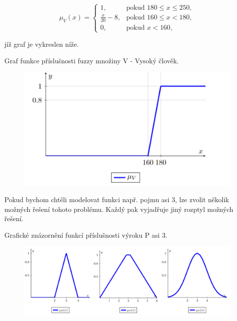     $$\mu_V(x)=\begin{cases} 1, & \mbox{pokud }  180\leq x \leq 250,\\ 
    \frac{x}{20} - 8, & \mbox{pokud } 160 \leq x < 180,\\
    0, & \mbox{pokud } x < 160,  \end{cases}$$

    jíž graf je vykreslen níže.

    \begin{graph} Graf funkce příslušnosti fuzzy množiny V - \clqq Vysoký člověk\crqq.\\
    \begin{figure}[h]
        \includegraphics[scale=0.65]{template-fig/vysoky_clovek.pdf}
        \centering
    \end{figure}
\end{graph}     



Pokud bychom chtěli modelovat funkci např. pojmu \clqq asi 3\crqq, lze zvolit několik možných řešení tohoto problému. Každý pak vyjadřuje jiný rozptyl možných řešení.
\begin{graph} Grafické znázornění funkcí příslušnosti výroku P \clqq asi 3\crqq.\\
    \begin{figure}[h]
        \includegraphics[scale=0.65]{template-fig/asi_3.pdf}
        \centering
    \end{figure}

\end{graph}


